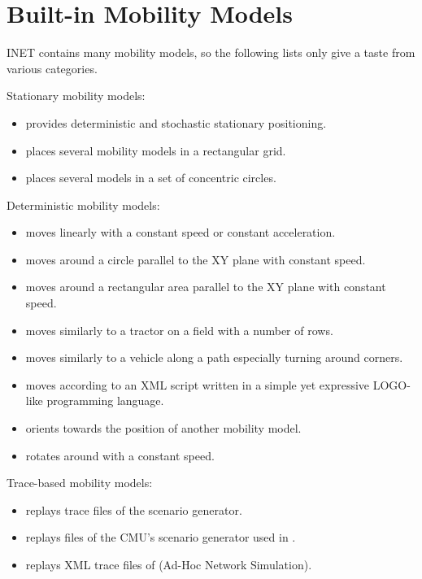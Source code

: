 \section{Built-in Mobility Models}

INET contains many mobility models, so the following lists only give a
taste from various categories.

Stationary mobility models:

\begin{itemize}
        \item {} provides deterministic and stochastic stationary positioning.
        \item {} places several mobility models in a rectangular grid.
        \item {} places several models in a set of concentric circles.
\end{itemize}

Deterministic mobility models:

\begin{itemize}
        \item {} moves linearly with a constant speed or constant acceleration.
        \item {} moves around a circle parallel to the XY plane with constant speed.
        \item {} moves around a rectangular area parallel to the XY plane with constant speed.
        \item {} moves similarly to a tractor on a field with a number of rows.
        \item {} moves similarly to a vehicle along a path especially turning around corners.
        \item {} moves according to an XML script written in a simple yet expressive LOGO-like programming language.
        \item {} orients towards the position of another mobility model.
        \item {} rotates around with a constant speed.
\end{itemize}

Trace-based mobility models:

\begin{itemize}
        \item {} replays trace files of the  scenario generator.
        \item {} replays files of the CMU’s scenario generator used in .
        \item {} replays XML trace files of  (Ad-Hoc Network Simulation).
\end{itemize}

